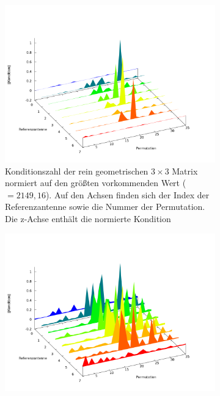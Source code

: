 \begin{figure}[h!]
         \centering
	     \caption[Ergebnisse der Konditionsanalyse alle Permutationen]{Analyse der Konditionszahlen aller möglichen Matrizen für den Messaufbau; Die Konditionszahl ist für jede mögliche Permutation an Messantennen für eine Referenzantenne angegeben}\label{fig:CondNumberAnalyze}
         \begin{subfigure}[t]{0.45\textwidth}
                 \centering
                 \includegraphics[width=\textwidth]{img/fenceModell3x3.png}
                 \caption{Konditionszahl der rein geometrischen $3\times3$ Matrix normiert auf den größten vorkommenden Wert ($=2149,16$). Auf den Achsen finden sich der Index der Referenzantenne sowie die Nummer der Permutation. Die z-Achse enthält die normierte Kondition}
                 \label{fig:AnalyzeOf3x3}
         \end{subfigure}
\qquad        
         \begin{subfigure}[t]{0.45\textwidth}
                 \centering
                 \includegraphics[width=\textwidth]{img/fenceModell9x3.png}

\end{subfigure}
\end{figure}

